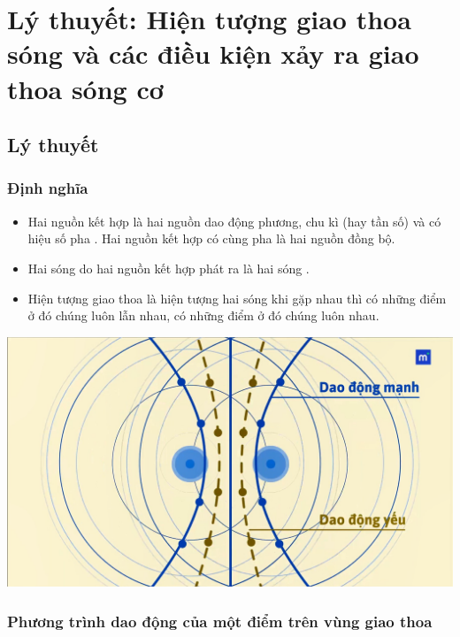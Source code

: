 
\chapter[Lý thuyết: Hiện tượng giao thoa sóng và các điều kiện xảy ra giao thoa sóng cơ]{Lý thuyết: Hiện tượng giao thoa sóng và các điều kiện xảy ra giao thoa sóng cơ}
\section{Lý thuyết}
\subsection{Định nghĩa}

\begin{itemize}
	\item 
	Hai nguồn kết hợp là hai nguồn dao động  phương,  chu kì (hay tần số) và có hiệu số pha . Hai nguồn kết hợp có cùng pha là hai nguồn đồng bộ.
	\item
	Hai sóng do hai nguồn kết hợp phát ra là hai sóng .
	\item 
	Hiện tượng giao thoa là hiện tượng hai sóng  khi gặp nhau thì có những điểm ở đó chúng luôn  lẫn nhau, có những điểm ở đó chúng luôn  nhau.
\end{itemize}
\begin{center}
	\includegraphics[scale=0.3]{../figs/VN12-PH-11-L-006-1-V2-1.jpg}
\end{center}
\subsection{Phương trình dao động của một điểm trên vùng giao thoa}

